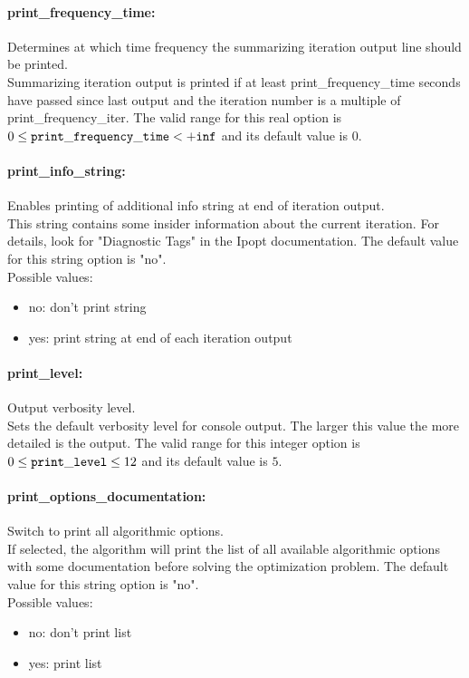 \paragraph{print\_frequency\_time:}\label{opt:print_frequency_time} Determines at which time frequency the summarizing iteration output line should be printed. \\
 Summarizing iteration output is printed if at least print\_frequency\_time seconds have passed since last output and the iteration number is a multiple of print\_frequency\_iter. The valid range for this real option is 
$0 \le {\tt print\_frequency\_time } <  {\tt +inf}$
and its default value is $0$.


\paragraph{print\_info\_string:}\label{opt:print_info_string} Enables printing of additional info string at end of iteration output. \\
 This string contains some insider information about the current iteration.  For details, look for "Diagnostic Tags" in the Ipopt documentation. The default value for this string option is "no".
\\ 
Possible values:
\begin{itemize}
   \item no: don't print string
   \item yes: print string at end of each iteration output
\end{itemize}

\paragraph{print\_level:}\label{opt:print_level} Output verbosity level. \\
 Sets the default verbosity level for console output. The larger this value the more detailed is the output. The valid range for this integer option is
$0 \le {\tt print\_level } \le 12$
and its default value is $5$.


\paragraph{print\_options\_documentation:}\label{opt:print_options_documentation} Switch to print all algorithmic options. \\
 If selected, the algorithm will print the list of all available algorithmic options with some documentation before solving the optimization problem. The default value for this string option is "no".
\\ 
Possible values:
\begin{itemize}
   \item no: don't print list
   \item yes: print list
\end{itemize}

